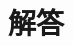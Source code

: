 \documentclass[11pt, uplatex, dvipdfmx, twoside]{jsarticle}
\begin{document}




  

\newpage


\section*{解答}
\end{document}
